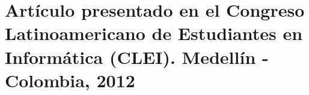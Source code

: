 \chapter{Artículo presentado en el Congreso Latinoamericano de Estudiantes en Informática (CLEI). Medellín - Colombia, 2012}
\label{ape:apendiceE}



%
